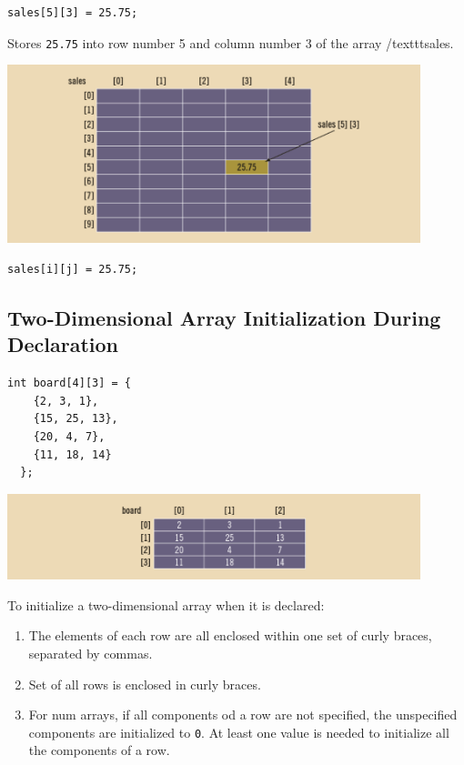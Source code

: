 \documentclass{article}
\begin{document}
\begin{lstlisting}[caption={Two-Dimensional Array Indexing Example}]
  sales[5][3] = 25.75;
\end{lstlisting}

Stores \texttt{25.75} into row number 5 and column number 3 of the array
/texttt{sales}.

\begin{center}
    \includegraphics[width=0.9\textwidth]{nD-arr-sales-ex.png}
\end{center}

\begin{lstlisting}[caption={Two-Dimensional Array Indexing With Vars Example}]
  sales[i][j] = 25.75;
\end{lstlisting}

\subsection{Two-Dimensional Array Initialization During Declaration}
\begin{lstlisting}[caption={Two-Dimensional Array Initialization Example}]
  int board[4][3] = {
    {2, 3, 1},
    {15, 25, 13},
    {20, 4, 7},
    {11, 18, 14}
  };
\end{lstlisting}

\begin{center}
    \includegraphics[width=0.9\textwidth]{2D-arr-board-init.png}
\end{center}

To initialize a two-dimensional array when it is declared:
\begin{enumerate}
  \item The elements of each row are all enclosed within one set of curly
    braces, separated by commas.
  \item Set of all rows is enclosed in curly braces.
  \item For num arrays, if all components od a row are not specified, the
    unspecified components are initialized to \texttt{0}. At least one value is
    needed to initialize all the components of a row.
\end{enumerate}
\end{document}
